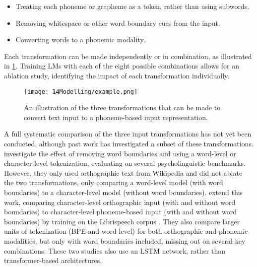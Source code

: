 \begin{itemize}
\setlength\itemsep{0.1em}
    \item {} Treating each phoneme or grapheme as a token, rather than using subwords.
    \item {} Removing whitespace or other word boundary cues from the input.
    \item {} Converting words to a phonemic modality. 
\end{itemize}

Each transformation can be made independently or in combination, as illustrated in \cref{fig:14-example}. Training LMs with each of the eight possible combinations allows for an ablation study, identifying the impact of each transformation individually. %

\begin{figure}[t]
    \centering
    \texttt{[image: 14Modelling/example.png]}
    \caption{An illustration of the three transformations that can be made to convert text input to a phoneme-based input representation.}
    \label{fig:14-example}
\end{figure}

A full systematic comparison of the three input transformations has not yet been conducted, although past work has investigated a subset of these transformations.  \citet{hahn-baroni-2019-tabula} investigate the effect of removing word boundaries and using a word-level or character-level tokenization, evaluating on several psycholinguistic benchmarks. However, they only used orthographic text from Wikipedia and did not ablate the two transformations, only comparing a word-level model (with word boundaries) to a character-level model (without word boundaries). \citet{nguyen-2022-word-boundaries} extend this work, comparing character-level orthographic input (with and without word boundaries) to character-level phoneme-based input (with and without word boundaries) by training on the Librispeech corpus \citep{panayotov2015librispeech}. They also compare larger units of tokenization (BPE and word-level) for both orthographic and phonemic modalities, but only with word boundaries included, missing out on several key combinations. These two studies also use an LSTM network, rather than transformer-based architectures.

